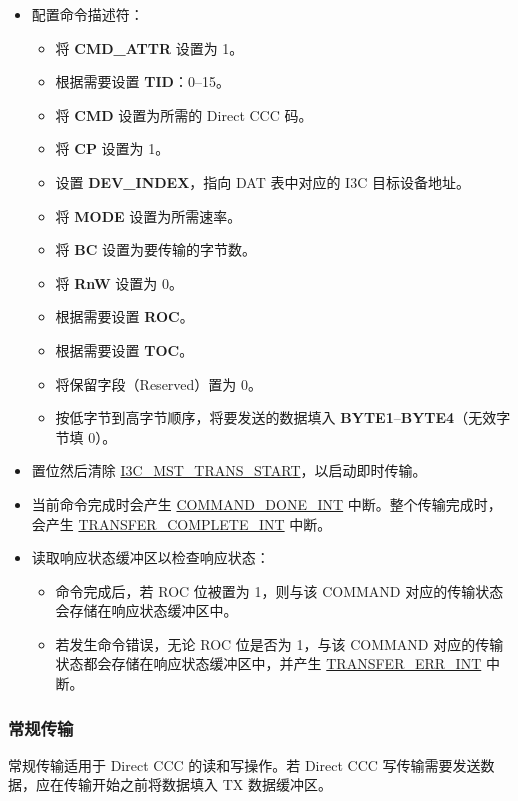 \documentclass[main\_\_CN.tex]{subfiles}
\begin{document}
\begin{itemize}
    \item 配置命令描述符：
    \begin{itemize}
        \item 将 \textbf{CMD\_ATTR} 设置为 1。
        \item 根据需要设置 \textbf{TID}：0–15。
        \item 将 \textbf{CMD} 设置为所需的 Direct CCC 码。
        \item 将 \textbf{CP} 设置为 1。
        \item 设置 \textbf{DEV\_INDEX}，指向 DAT 表中对应的 I3C 目标设备地址。
        \item 将 \textbf{MODE} 设置为所需速率。
        \item 将 \textbf{BC} 设置为要传输的字节数。
        \item 将 \textbf{RnW} 设置为 0。
        \item 根据需要设置 \textbf{ROC}。
        \item 根据需要设置 \textbf{TOC}。
        \item 将保留字段（Reserved）置为 0。
        \item 按低字节到高字节顺序，将要发送的数据填入 \textbf{BYTE1}–\textbf{BYTE4}（无效字节填 0）。
    \end{itemize}
    \item 置位然后清除 \hyperref[fielddesc:I3CMSTREGTRANSSTART]{I3C\_MST\_TRANS\_START}，以启动即时传输。
    \item 当前命令完成时会产生 \hyperref[int:COMMANDDONEINT]{COMMAND\_DONE\_INT} 中断。整个传输完成时，会产生 \hyperref[int:TRANSFERCOMPLETEINT]{TRANSFER\_COMPLETE\_INT} 中断。
    \item 读取响应状态缓冲区以检查响应状态：
    \begin{itemize}
        \item 命令完成后，若 ROC 位被置为 1，则与该 COMMAND 对应的传输状态会存储在响应状态缓冲区中。
        \item 若发生命令错误，无论 ROC 位是否为 1，与该 COMMAND 对应的传输状态都会存储在响应状态缓冲区中，并产生 \hyperref[int:TRANSFERERRINT]{TRANSFER\_ERR\_INT} 中断。
    \end{itemize}
\end{itemize}

\subsubsection{常规传输}
常规传输适用于 Direct CCC 的读和写操作。若 Direct CCC 写传输需要发送数据，应在传输开始之前将数据填入 TX 数据缓冲区。
\end{document}
